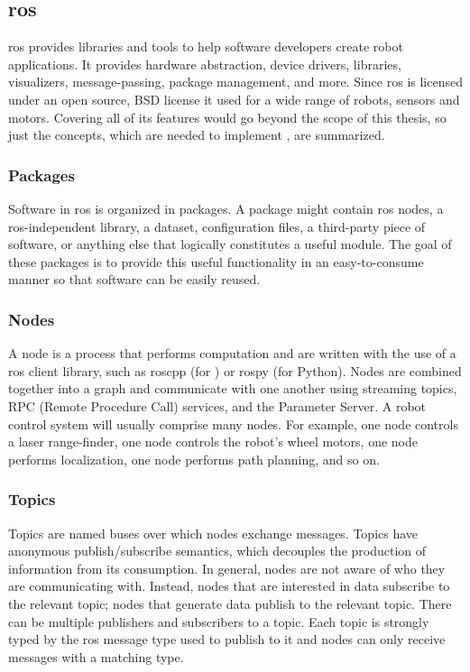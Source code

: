 \subsection{\gls{ros}} \label{sub:ros}
\gls{ros} provides libraries and tools to help software developers create robot applications. It provides hardware abstraction, device drivers, libraries, visualizers, message-passing, package management, and more. Since \gls{ros} is licensed under an open source, BSD license it used for a wide range of robots, sensors and motors. Covering all of its features would go beyond the scope of this thesis, so just the concepts, which are needed to implement \toolname{}, are summarized. \cite{WikiROS}

\subsubsection{Packages}
Software in \gls{ros} is organized in packages. A package might contain \gls{ros} nodes, a \gls{ros}-independent library, a dataset, configuration files, a third-party piece of software, or anything else that logically constitutes a useful module. The goal of these packages is to provide this useful functionality in an easy-to-consume manner so that software can be easily reused.

\subsubsection{Nodes}
A node is a process that performs computation and are written with the use of a \gls{ros} client library, such as roscpp (for \Cpp{}) or rospy (for Python). Nodes are combined together into a graph and communicate with one another using streaming topics, RPC (Remote Procedure Call) services, and the Parameter Server. A robot control system will usually comprise many nodes. For example, one node controls a laser range-finder, one node controls the robot's wheel motors, one node performs localization, one node performs path planning, and so on.

\subsubsection{Topics}
Topics are named buses over which nodes exchange messages. Topics have anonymous publish/subscribe semantics, which decouples the production of information from its consumption. In general, nodes are not aware of who they are communicating with. Instead, nodes that are interested in data subscribe to the relevant topic; nodes that generate data publish to the relevant topic. There can be multiple publishers and subscribers to a topic. Each topic is strongly typed by the \gls{ros} message type used to publish to it and nodes can only receive messages with a matching type.

